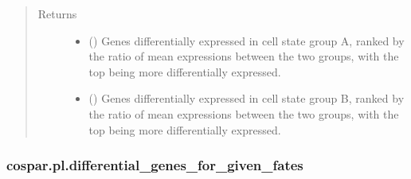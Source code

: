 \documentclass[letterpaper,10pt,english]{sphinxmanual}
\begin{document}
\begin{fulllineitems}
\begin{quote}
\begin{description}
\begin{description}
\end{description}

\item[{Returns}] \leavevmode
\begin{itemize}
\item {} 
 () \textendash{} Genes differentially expressed in cell state group A, ranked
by the ratio of mean expressions between
the two groups, with the top being more differentially expressed.

\item {} 
 () \textendash{} Genes differentially expressed in cell state group B, ranked
by the ratio of mean expressions between
the two groups, with the top being more differentially expressed.

\end{itemize}


\end{description}\end{quote}

\end{fulllineitems}



\subsubsection{cospar.pl.differential\_genes\_for\_given\_fates}
\label{\detokenize{cospar.pl.differential_genes_for_given_fates:cospar-pl-differential-genes-for-given-fates}}\label{\detokenize{cospar.pl.differential_genes_for_given_fates::doc}}
\end{document}
